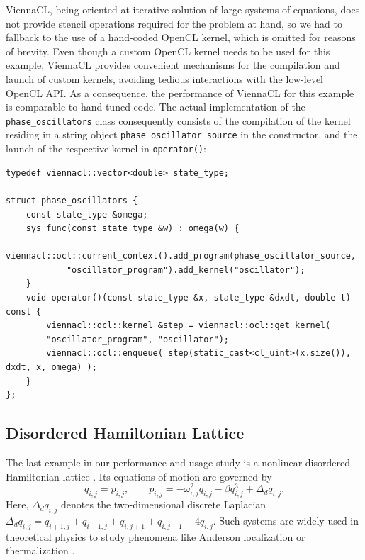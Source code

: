 \documentclass[final]{siamltex}
\newcommand{\code}[1]{\lstinline|#1|}
\begin{document}
ViennaCL, being oriented at iterative solution of large systems of equations,
does not provide stencil operations required for the problem at hand, so we had
to fallback to the use of a hand-coded OpenCL kernel, which is omitted for
reasons of brevity.  Even though a custom OpenCL kernel needs to be used for
this example, ViennaCL provides convenient mechanisms for the compilation and
launch of custom kernels, avoiding tedious interactions with the low-level
OpenCL API.  As a consequence, the performance of ViennaCL for this example is
comparable to hand-tuned code.  The actual implementation of the
\code{phase_oscillators} class consequently consists of the compilation of the
kernel residing in a string object \code{phase_oscillator_source} in the
constructor, and the launch of the respective kernel in \code{operator()}:
\begin{lstlisting}
typedef viennacl::vector<double> state_type;

struct phase_oscillators {
    const state_type &omega;
    sys_func(const state_type &w) : omega(w) {
        viennacl::ocl::current_context().add_program(phase_oscillator_source,
            "oscillator_program").add_kernel("oscillator");
    }
    void operator()(const state_type &x, state_type &dxdt, double t) const {
        viennacl::ocl::kernel &step = viennacl::ocl::get_kernel(
		"oscillator_program", "oscillator");
        viennacl::ocl::enqueue( step(static_cast<cl_uint>(x.size()), dxdt, x, omega) );
    }
};
\end{lstlisting}




%
%
\subsection{Disordered Hamiltonian Lattice}


The last example in our performance and usage study is a 
nonlinear disordered Hamiltonian lattice \cite{mulansky_scaling_2012}. Its
equations of motion are governed by
\begin{equation}
\dot{q}_{i,j} = p_{i,j}, \quad \quad
\dot{p}_{i,j} = - \omega_{i,j}^2 q_{i,j} - \beta q_{i,j}^3 + \Delta_d q_{i,j}.
\label{eq:disordered_ham}
\end{equation}
Here, $\Delta_d q_{i,j}$ denotes the two-dimensional discrete Laplacian
$\Delta_d
q_{i,j}=q_{i+1,j}+q_{i-1,j}+q_{i,j+1}+q_{i,j-1}-4q_{i,j}$. Such
systems are widely used in theoretical physics to study phenomena
like Anderson localization \cite{Sheng-06} or thermalization \cite{FPUScholarpedia}. 
\end{document}
